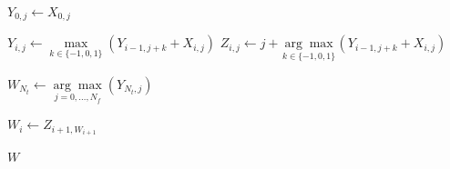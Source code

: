 \documentclass[paper-main.tex]{subfiles}
\begin{document}
\begin{algorithmic}

		\State $Y_{0,j} \gets X_{0,j}$
    \EndFor

		
	    	\State $Y_{i,j} \gets \underset{k \in \{-1,0,1\}}{\max} (Y_{i-1,j+k} + X_{i,j})$
	    	\State $Z_{i,j} \gets j + \underset{k \in \{-1,0,1\}}{\arg\max} (Y_{i-1,j+k} + X_{i,j})$
   
	    \EndFor
    \EndFor

    \State $W_{N_t} \gets \underset{j=0,\ldots,N_f}{\arg\max} (Y_{N_t,j})$


		\State $W_i \gets Z_{i+1, W_{i+1}}$

    \EndFor    

    \State \Return $W$
\EndFunction
\end{algorithmic}



\end{document}

